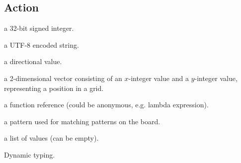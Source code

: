 \subsection{Action}

\begin{description}[noitemsep]
\item[Integer] a 32-bit signed integer.
\item[String] a UTF-8 encoded string.
\item[Direction] a directional value.
\item[Coordinate] a 2-dimensional vector consisting of an $x$-integer value and
a $y$-integer value, representing a position in a grid.
\item[Function] a function reference (could be anonymous, e.g. lambda expression).
\item[Pattern] a pattern used for matching patterns on the board.
\item[List] a list of values (can be empty).
\item[Action]
\end{description}


Dynamic typing.



